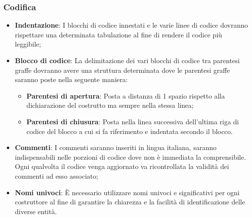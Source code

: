 \subsubsection{Codifica}
\begin{itemize}
    \item \textbf{Indentazione}: I blocchi di codice innestati e le varie linee di codice dovranno rispettare una determinata tabulazione al fine di rendere il codice più leggibile;
    \item \textbf{Blocco di codice}: La delimitazione dei vari blocchi di codice tra parentesi graffe dovranno avere una struttura determinata dove le parentesi 
    graffe saranno poste nella seguente maniera:
    \begin{itemize}
        \item \textbf{Parentesi di apertura}: Posta a distanza di 1 spazio rispetto alla dichiarazione del costrutto ma sempre nella stessa linea;
        \item \textbf{Parentesi di chiusura}: Posta nella linea successiva dell’ultima riga di codice del blocco a cui si fa riferimento e indentata secondo il blocco. 
    \end{itemize}
    \item \textbf{Commenti}: I commenti saranno inseriti in lingua italiana, saranno indispensabili nelle porzioni di codice dove non è immediata la comprensibile. Ogni qualvolta il codice 
    venga aggiornato va ricontrollata la validità dei commenti ad esso associato;
    \item \textbf{Nomi univoci}: È necessario utilizzare nomi univoci e significativi per ogni costruttore al fine di garantire la chiarezza e la facilità di identificazione delle diverse entità.
\end{itemize}









